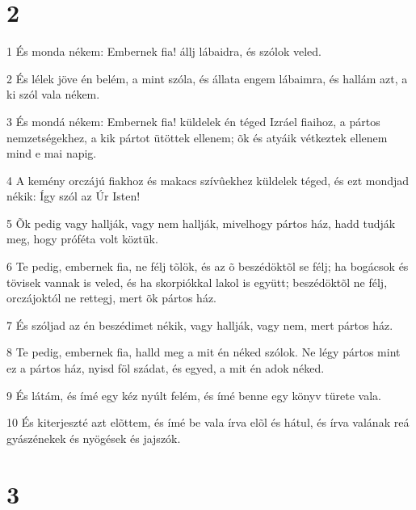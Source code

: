 \chapter{2}

\par 1 És monda nékem: Embernek fia! állj lábaidra, és szólok veled.
\par 2 És lélek jöve én belém, a mint szóla, és állata engem lábaimra, és hallám azt, a ki szól vala nékem.
\par 3 És mondá nékem: Embernek fia! küldelek én téged Izráel fiaihoz, a pártos nemzetségekhez, a kik pártot ütöttek ellenem; õk és atyáik vétkeztek ellenem mind e mai napig.
\par 4 A kemény orczájú fiakhoz és makacs szívûekhez küldelek téged, és ezt mondjad nékik: Így szól az Úr Isten!
\par 5 Õk pedig vagy hallják, vagy nem hallják, mivelhogy pártos ház, hadd tudják meg, hogy próféta volt köztük.
\par 6 Te pedig, embernek fia, ne félj tõlök, és az õ beszédöktõl se félj; ha bogácsok és tövisek vannak is veled, és ha skorpiókkal lakol is együtt; beszédöktõl ne félj, orczájoktól ne rettegj, mert õk pártos ház.
\par 7 És szóljad az én beszédimet nékik, vagy hallják, vagy nem, mert pártos ház.
\par 8 Te pedig, embernek fia, halld meg a mit én néked szólok. Ne légy pártos mint ez a pártos ház, nyisd föl szádat, és egyed, a mit én adok néked.
\par 9 És látám, és ímé egy kéz nyúlt felém, és ímé benne egy könyv türete vala.
\par 10 És kiterjeszté azt elõttem, és ímé be vala írva elõl és hátul, és írva valának reá gyászénekek és nyögések és jajszók.

\chapter{3}

